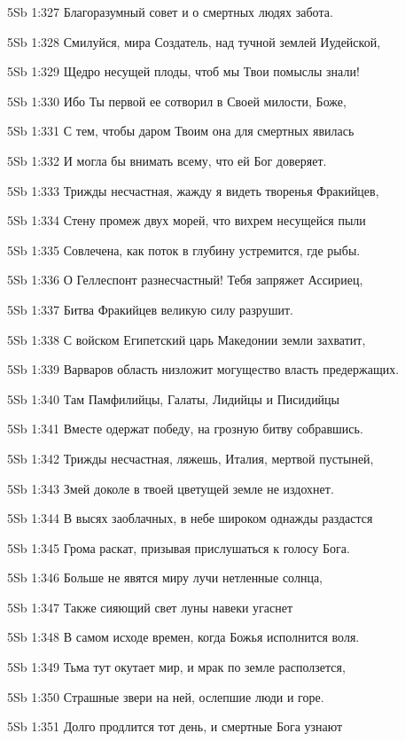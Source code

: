 \vs 5Sb 1:327 Благоразумный совет и о смертных людях забота.

\vs 5Sb 1:328 Смилуйся, мира Создатель, над тучной землей Иудейской, 

\vs 5Sb 1:329 Щедро несущей плоды, чтоб мы Твои помыслы знали! 

\vs 5Sb 1:330 Ибо Ты первой ее сотворил в Своей милости, Боже, 

\vs 5Sb 1:331 С тем, чтобы даром Твоим она для смертных явилась 

\vs 5Sb 1:332 И могла бы внимать всему, что ей Бог доверяет.

\vs 5Sb 1:333 Трижды несчастная, жажду я видеть творенья Фракийцев,

\vs 5Sb 1:334 Стену промеж двух морей, что вихрем несущейся пыли

\vs 5Sb 1:335 Совлечена, как поток в глубину устремится, где рыбы.

\vs 5Sb 1:336 О Геллеспонт разнесчастный! Тебя запряжет Ассириец, 

\vs 5Sb 1:337 Битва Фракийцев великую силу разрушит. 

\vs 5Sb 1:338 С войском Египетский царь Македонии земли захватит, 

\vs 5Sb 1:339 Варваров область низложит могущество власть предержащих. 

\vs 5Sb 1:340 Там Памфилийцы, Галаты, Лидийцы и Писидийцы 

\vs 5Sb 1:341 Вместе одержат победу, на грозную битву собравшись.

\vs 5Sb 1:342 Трижды несчастная, ляжешь, Италия, мертвой пустыней, 

\vs 5Sb 1:343 Змей доколе в твоей цветущей земле не издохнет.

\vs 5Sb 1:344 В высях заоблачных, в небе широком однажды раздастся 

\vs 5Sb 1:345 Грома раскат, призывая прислушаться к голосу Бога. 

\vs 5Sb 1:346 Больше не явятся миру лучи нетленные солнца, 

\vs 5Sb 1:347 Также сияющий свет луны навеки угаснет  

\vs 5Sb 1:348 В самом исходе времен, когда Божья исполнится воля.

\vs 5Sb 1:349 Тьма тут окутает мир, и мрак по земле расползется, 

\vs 5Sb 1:350 Страшные звери на ней, ослепшие люди и горе.

\vs 5Sb 1:351 Долго продлится тот день, и смертные Бога узнают 

